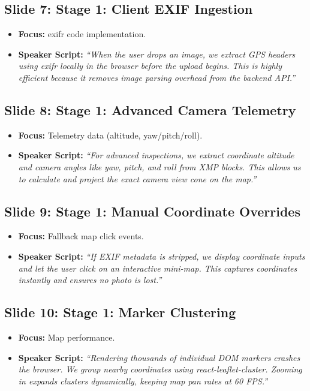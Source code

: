 \documentclass[11pt]{article}
\begin{document}
\subsection{Slide 7: Stage 1: Client EXIF Ingestion}
\begin{itemize}
    \item \textbf{Focus:} exifr code implementation.
    \item \textbf{Speaker Script:} 
    \textit{``When the user drops an image, we extract GPS headers using exifr locally in the browser before the upload begins. This is highly efficient because it removes image parsing overhead from the backend API.''}
\end{itemize}

\subsection{Slide 8: Stage 1: Advanced Camera Telemetry}
\begin{itemize}
    \item \textbf{Focus:} Telemetry data (altitude, yaw/pitch/roll).
    \item \textbf{Speaker Script:} 
    \textit{``For advanced inspections, we extract coordinate altitude and camera angles like yaw, pitch, and roll from XMP blocks. This allows us to calculate and project the exact camera view cone on the map.''}
\end{itemize}

\subsection{Slide 9: Stage 1: Manual Coordinate Overrides}
\begin{itemize}
    \item \textbf{Focus:} Fallback map click events.
    \item \textbf{Speaker Script:} 
    \textit{``If EXIF metadata is stripped, we display coordinate inputs and let the user click on an interactive mini-map. This captures coordinates instantly and ensures no photo is lost.''}
\end{itemize}

\subsection{Slide 10: Stage 1: Marker Clustering}
\begin{itemize}
    \item \textbf{Focus:} Map performance.
    \item \textbf{Speaker Script:} 
    \textit{``Rendering thousands of individual DOM markers crashes the browser. We group nearby coordinates using react-leaflet-cluster. Zooming in expands clusters dynamically, keeping map pan rates at 60 FPS.''}
\end{itemize}
\end{document}

